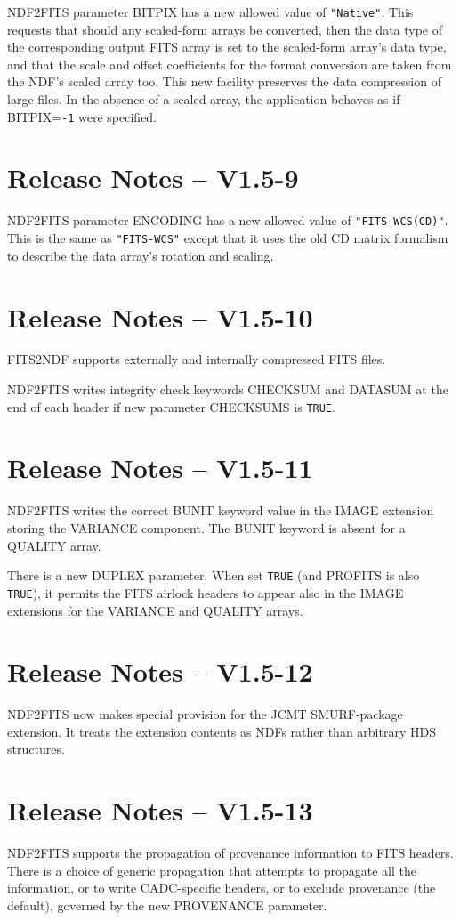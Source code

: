 \documentclass[twoside,11pt]{article}
\newcommand{\htmlref}[2]{#1}
\begin{document}
\htmlref{NDF2FITS}{NDF2FITS} parameter BITPIX has a new allowed value
of \texttt{"Native"}.  This requests that should any scaled-form arrays be 
converted, then the data type of the corresponding output FITS array 
is set to the scaled-form array's data type, and that the scale and
offset coefficients for the format conversion are taken from the NDF's
scaled array too.  This new facility preserves the data compression
of large files.  In the absence of a scaled array, the application
behaves as if BITPIX=\texttt{-1} were specified.

\section{Release Notes -- V1.5-9}

\htmlref{NDF2FITS}{NDF2FITS} parameter ENCODING has a new allowed
value of \texttt{"FITS-WCS(CD)"}.  This is the same as
\texttt{"FITS-WCS"} except that it uses the old CD matrix formalism 
to describe the data array's rotation and scaling.

\section{Release Notes -- V1.5-10}

\htmlref{FITS2NDF}{FITS2NDF} supports externally and internally compressed
FITS files.

\htmlref{NDF2FITS}{NDF2FITS} writes integrity check keywords CHECKSUM
and DATASUM at the end of each header if new parameter CHECKSUMS is 
\texttt{TRUE}.

\section{Release Notes -- V1.5-11}

\htmlref{NDF2FITS}{NDF2FITS} writes the correct BUNIT keyword value in 
the IMAGE extension storing the VARIANCE component.  The BUNIT
keyword is absent for a QUALITY array.

There is a new DUPLEX parameter.  When set \texttt{TRUE} (and PROFITS
is also \texttt{TRUE}), it permits the FITS airlock headers to appear
also in the IMAGE extensions for the VARIANCE and QUALITY arrays.

\section{Release Notes -- V1.5-12}

\htmlref{NDF2FITS}{NDF2FITS} now makes special provision for the JCMT
SMURF-package extension.  It treats the extension contents as NDFs
rather than arbitrary HDS structures.

\section{Release Notes -- V1.5-13}

\htmlref{NDF2FITS}{NDF2FITS} supports the propagation of provenance
information to FITS headers.  There is a choice of generic propagation
that attempts to propagate all the information, or to write
CADC-specific headers, or to exclude provenance (the default),
governed by the new PROVENANCE parameter.
\end{document}
